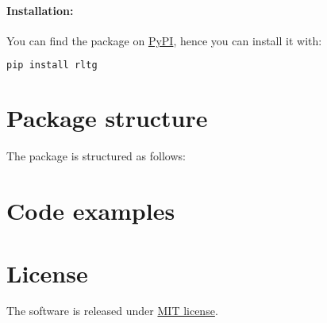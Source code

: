 \paragraph{Installation:} You can find the package on \href{https://pypi.org/project/rltg/}{PyPI}, hence you can install it with:
\begin{lstlisting}[language=bash]
pip install rltg
\end{lstlisting}

\section{Package structure}
The package is structured as follows:
\section{Code examples}

\section{License}
The software is released under \href{https://github.com/MarcoFavorito/rltg/blob/master/LICENSE}{MIT license}.